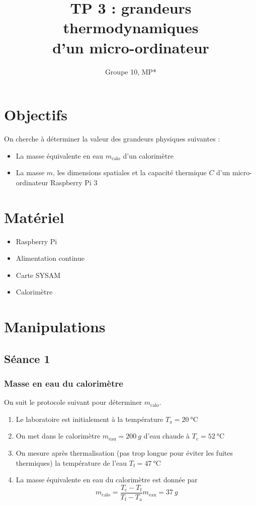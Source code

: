 \documentclass[french]{article}
\title{TP 3 : grandeurs thermodynamiques\\
d'un micro-ordinateur}
\author{Groupe 10, MP*}
\newcommand{\cel}{\degreeCelsius}
\begin{document}
\maketitle

\section{Objectifs}

On cherche à déterminer la valeur des grandeurs physiques suivantes :
\begin{itemize}
    \item La masse équivalente en eau $m_{\text{calo}}$ d'un calorimètre
    \item La masse $m$, les dimensions spatiales et la capacité thermique $C$ d'un micro-ordinateur Raspberry Pi 3
\end{itemize}
\section{Matériel}

\begin{itemize}
    \item Raspberry Pi
    \item Alimentation continue
    \item Carte SYSAM
    \item Calorimètre
\end{itemize}

\section{Manipulations}

\subsection{Séance 1}

\subsubsection{Masse en eau du calorimètre}

On suit le protocole suivant pour déterminer $m_\text{calo}$.
\begin{enumerate}
    \item Le laboratoire est initialement à la température $T_\text{a} = \SI{20}{\cel}$
    \item On met dans le calorimètre $m_\text{eau} = \SI{200}{g}$ d'eau chaude à $T_\text{c} = \SI{52}{\cel}$
    \item On mesure après thermalisation (pas trop longue pour éviter les fuites thermiques) la température de l'eau $T_\text{f} = \SI{47}{\cel}$
    \item La masse équivalente en eau du calorimètre est donnée par
    $$m_\text{calo} = \frac{T_\text{c} - T_\text{f}}{T_\text{f} - T_\text{a}} m_\text{eau} = \SI{37}{g}$$

\end{enumerate}
\end{document}
